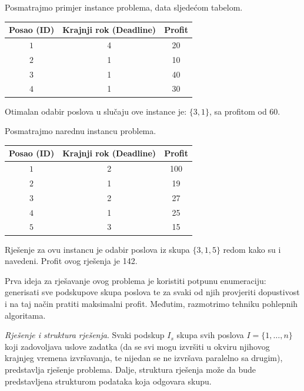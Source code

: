 \begin{solution}
	Posmatrajmo primjer instance problema, data sljedećom tabelom.
\begin{center}
 
 
	\begin{tabular}{ccc }
	 \centering
	Posao (ID) & Krajnji rok (Deadline) & Profit \\ \hline \hline
	$1$	&	4	&	20 \\
	$2$	&	1	&	10\\
	$3$	&	1	&	40\\
	$4$	&	1	&	30\\ \hline
	\end{tabular}
\end{center}

Otimalan odabir poslova u slučaju ove instance je: $\{3, 1\}$, sa profitom od 60. 

Posmatrajmo narednu instancu problema.  
\begin{center}
	
	
	\begin{tabular}{ccc }
		\centering
		Posao (ID) & Krajnji rok (Deadline) & Profit \\ \hline \hline
		$1$	&	2	&	100 \\
		$2$	&	1	&	19\\
		$3$	&	2	&	27\\
		$4$	&	1	&	25\\  
	 $5$	&	3	&	15\\   \hline
	\end{tabular}
\end{center}
	
\end{solution}

Rješenje za ovu instancu je odabir poslova iz skupa $\{3, 1,5 \}$ redom kako su i navedeni. Profit ovog rješenja je 142. 


Prva ideja za rješavanje ovog problema je koristiti potpunu enumeraciju: generisati sve podskupove
skupa poslova te za svaki od njih provjeriti dopustivost i na taj način pratiti  
maksimalni profit. Međutim, razmotrimo  tehniku pohlepnih algoritama.   \\ \vspace{0.2cm}

\textit{Rješenje i struktura rješenja}. Svaki podskup $I_s$ skupa svih poslova $I=\{1,\ldots, n\}$ koji zadovoljava uslove zadatka (da se svi mogu izvršiti u okviru njihovog krajnjeg vremena izvršavanja, te nijedan se ne izvršava paralelno sa drugim),  predstavlja rješenje problema. Dalje, struktura rješenja može da bude predstavljena strukturom podataka koja odgovara skupu. 

